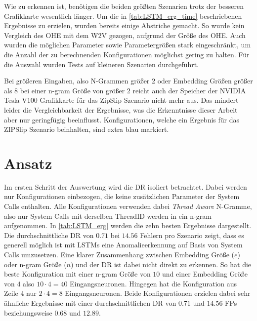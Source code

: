     Wie zu erkennen ist, benötigen die beiden größten Szenarien trotz der besseren Grafikkarte wesentlich länger.
    Um die in \autoref{tab:LSTM_erg_time} beschriebenen Ergebnisse zu erzielen, wurden bereits einige Abstriche gemacht.
    So wurde kein Vergleich des \ac{OHE} mit dem \ac{W2V} gezogen, aufgrund der Größe des \ac{OHE}.
    Auch wurden die möglichen Parameter sowie Parametergrößen stark eingeschränkt, um die Anzahl der zu berechnenden Konfigurationen möglichst gering zu halten.
    Für die Auswahl wurden Tests auf kleineren Szenarien durchgeführt.
    
    Bei größeren Eingaben, also N-Grammen größer $2$ oder Embedding Größen größer als $8$ bei einer n-gram Größe von größer $2$ reicht auch der Speicher der NVIDIA Tesla V100 Grafikkarte für das ZipSlip Szenario nicht mehr aus.
    Das mindert leider die Vergleichbarkeit der Ergebnisse, was die Erkenntnisse dieser Arbeit aber nur geringfügig beeinflusst.
    Konfigurationen, welche ein Ergebnis für das ZIPSlip Szenario beinhalten, sind extra blau markiert.

    \section{ Ansatz}\label{sec:erg_LSTM}

    Im ersten Schritt der Auswertung wird die \ac{DR} isoliert betrachtet.
    Dabei werden nur Konfigurationen einbezogen, die keine zusätzlichen Parameter der System Calls enthalten.
    Alle Konfigurationen verwenden dabei \textit{Thread Aware} N-Gramme, also nur System Calls mit derselben ThreadID werden in ein n-gram aufgenommen.
    In \autoref{tab:LSTM_erg} werden die zehn besten Ergebnisse dargestellt.
    Die durchschnittliche \ac{DR} von $0.71$ bei $14.56$ Fehlern pro Szenario zeigt, dass es generell möglich ist mit \acp{LSTM} eine Anomalieerkennung auf Basis von System Calls umzusetzen.
    Eine klarer Zusammenhang zwischen Embedding Größe ($e$) oder n-gram Größe ($n$) und der \ac{DR} ist dabei nicht direkt zu erkennen.
    So hat die beste Konfiguration mit einer n-gram Größe von $10$ und einer Embedding Größe von $4$ also $10 \cdot 4=40$ Eingangsneuronen.
    Hingegen hat die Konfiguration aus Zeile $4$ nur $2 \cdot 4 = 8$ Eingangsneuronen.
    Beide Konfigurationen erzielen dabei sehr ähnliche Ergebnisse mit einer durchschnittlichen \ac{DR} von $0.71$ und $14.56$ \acp{FP} beziehungsweise $0.68$ und $12.89$.

